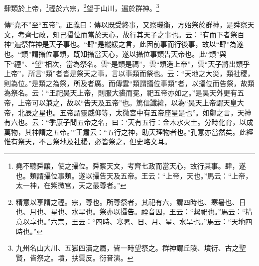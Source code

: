 肆類於上帝，\footnote{堯不聽舜讓，使之攝位。舜察天文，考齊七政而當天心，故行其事。肆，遂也。類謂攝位事類。遂以攝告天及五帝。王云：“上帝，天也。”馬云：“上帝，太一神，在紫微宮，天之最尊者。”}禋於六宗，\footnote{精意以享謂之禋。宗，尊也。所尊祭者，其祀有六，謂四時也、寒暑也、日也、月也、星也、水旱也。祭亦以攝告。禋音因，王云：“絜祀也。”馬云：“精意以享也。”六宗，王云：“四時、寒暑、日、月、星、水旱也。”馬云：“天地四時也。”}望于山川，遍於群神。\footnote{九州名山大川、五嶽四瀆之屬，皆一時望祭之。群神謂丘陵、墳衍、古之聖賢，皆祭之。墳，扶雲反。衍音演。}

{\noindent\zhuan{}\fzbyks 傳“堯不”至“五帝”。正義曰：傳以既受終事，又察璣衡，方始祭於群神，是舜察天文，考齊七政，知己攝位而當於天心，故行其天子之事也。云：“有而下者祭百神”遍祭群神是天子事也。“肆”是縱緩之言，此因前事而行後事，故以“肆”為遂也。“類”謂攝位事類，既知攝當天心，遂以攝位事類告天帝也。此“類”與下“禋”、“望”相次，當為祭名。雲“是類是禡”，雲“類造上帝”，雲“天子將出類乎上帝”，所言“類”者皆是祭天之事，言以事類而祭也。云：“天地之大災，類社稷，則為位。”是類之為祭，所及者廣。而傳雲“類謂攝位事類”者，以攝位而告祭，故類為祭名。云：“王祀昊天上帝，則服大裘而冕，祀五帝亦如之。”是昊天外更有五帝，上帝可以兼之，故以“告天及五帝”也。篤信讖緯，以為“昊天上帝謂天皇大帝，北辰之星也。五帝謂靈威仰等，太微宮中有五帝座星是也”。如鄭之言，天神有六也。云：“季康子問五帝之名，曰：‘天有五行：金木水火土。分時化育，以成萬物，其神謂之五帝。’”王肅云：“五行之神，助天理物者也。”孔意亦當然矣。此經惟有祭天，不言祭地及社稷，必皆祭之，但史略文耳。 \par}

